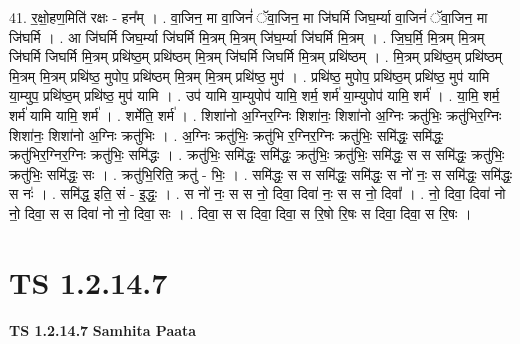 \documentclass[17pt]{extarticle}
\begin{document}
41. र॒क्षो॒हण॒मिति॑ रक्षः - हन᳚म् । . वा॒जिन॒ मा वा॒जिनं॑ ॅवा॒जिन॒ मा जि॑घर्मि जिघ॒र्म्या वा॒जिनं॑ ॅवा॒जिन॒ मा जि॑घर्मि । . आ जि॑घर्मि जिघ॒र्म्या जि॑घर्मि मि॒त्रम् मि॒त्रम् जि॑घ॒र्म्या जि॑घर्मि मि॒त्रम् । . जि॒घ॒र्मि॒ मि॒त्रम् मि॒त्रम् जि॑घर्मि जिघर्मि मि॒त्रम् प्रथि॑ष्ठ॒म् प्रथि॑ष्ठम् मि॒त्रम् जि॑घर्मि जिघर्मि मि॒त्रम् प्रथि॑ष्ठम् । . मि॒त्रम् प्रथि॑ष्ठ॒म् प्रथि॑ष्ठम् मि॒त्रम् मि॒त्रम् प्रथि॑ष्ठ॒ मुपोप॒ प्रथि॑ष्ठम् मि॒त्रम् मि॒त्रम् प्रथि॑ष्ठ॒ मुप॑ । . प्रथि॑ष्ठ॒ मुपोप॒ प्रथि॑ष्ठ॒म् प्रथि॑ष्ठ॒ मुप॑ यामि या॒म्युप॒ प्रथि॑ष्ठ॒म् प्रथि॑ष्ठ॒ मुप॑ यामि । . उप॑ यामि या॒म्युपोप॑ यामि॒ शर्म॒ शर्म॑ या॒म्युपोप॑ यामि॒ शर्म॑ । . या॒मि॒ शर्म॒ शर्म॑ यामि यामि॒ शर्म॑ । . शर्मेति॒ शर्म॑ । . शिशा॑नो अ॒ग्निर॒ग्निः शिशा॑नः॒ शिशा॑नो अ॒ग्निः क्रतु॑भिः॒ क्रतु॑भिर॒ग्निः शिशा॑नः॒ शिशा॑नो अ॒ग्निः क्रतु॑भिः । . अ॒ग्निः क्रतु॑भिः॒ क्रतु॑भि र॒ग्निर॒ग्निः क्रतु॑भिः॒ समि॑द्धः॒ समि॑द्धः॒ क्रतु॑भिर॒ग्निर॒ग्निः क्रतु॑भिः॒ समि॑द्धः । . क्रतु॑भिः॒ समि॑द्धः॒ समि॑द्धः॒ क्रतु॑भिः॒ क्रतु॑भिः॒ समि॑द्धः॒ स स समि॑द्धः॒ क्रतु॑भिः॒ क्रतु॑भिः॒ समि॑द्धः॒ सः । . क्रतु॑भि॒रिति॒ क्रतु॑ - भिः॒ । . समि॑द्धः॒ स स समि॑द्धः॒ समि॑द्धः॒ स नो॑ नः॒ स समि॑द्धः॒ समि॑द्धः॒ स नः॑ । . समि॑द्ध॒ इति॒ सं - इ॒द्धः॒ । . स नो॑ नः॒ स स नो॒ दिवा॒ दिवा॑ नः॒ स स नो॒ दिवा᳚ । . नो॒ दिवा॒ दिवा॑ नो नो॒ दिवा॒ स स दिवा॑ नो नो॒ दिवा॒ सः । . दिवा॒ स स दिवा॒ दिवा॒ स रि॒षो रि॒षः स दिवा॒ दिवा॒ स रि॒षः । \newline
\pagebreak
{}

\section{ TS 1.2.14.7 }

\textbf{TS 1.2.14.7 } \newline
\textbf{Samhita Paata} \newline
\end{document}
